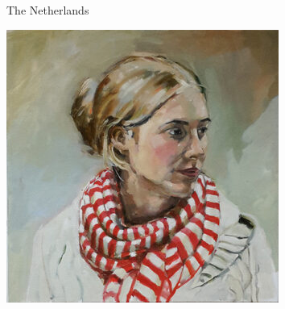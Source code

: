 \documentclass[a3paper, 12pt]{article}
\begin{document}
\begin{minipage}[t]{.43\linewidth}
\begin{minipage}{.75\linewidth}
    The Netherlands
  \end{minipage}
  \hfill
  \begin{minipage}{.2\linewidth}
    \includegraphics[width=\linewidth, trim=30 50 30 0, clip]{figs/jana}
  \end{minipage}

  \medskip


\end{minipage}
\end{document}
